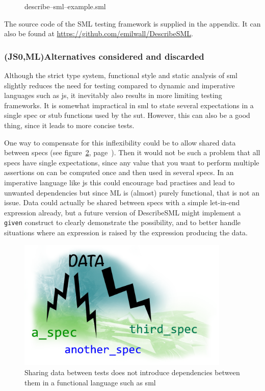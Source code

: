 \documentclass[11pt]{article}
\begin{document}
\begin{figure}[ht!]

\caption{describe–sml–example.sml}
\label{lst:describesmlexample}
\end{figure}

The source code of the SML testing framework is supplied in the appendix. It can also be found at \url{https://github.com/emilwall/DescribeSML}.

\subsubsection{(JS0,ML)Alternatives considered and discarded}

Although the strict type system, functional style and static analysis of \gls{sml} slightly reduces the need for testing compared to dynamic and imperative languages such as \gls{js}, it inevitably also results in more limiting testing frameworks. It is somewhat impractical in \gls{sml} to state several expectations in a single \gls{spec} or stub functions used by the \gls{sut}. However, this can also be a good thing, since it leads to more concise tests.

One way to compensate for this inflexibility could be to allow shared data between \glspl{spec} (see figure~\ref{fig:data}, page~\pageref{fig:data}). Then it would not be such a problem that all \glspl{spec} have single expectations, since any value that you want to perform multiple assertions on can be computed once and then used in several \glspl{spec}. In an imperative language like \gls{js} this could encourage bad practises and lead to unwanted dependencies but since ML is (almost) purely functional, that is not an issue. Data could actually be shared between \glspl{spec} with a simple let-in-end expression already, but a future version of DescribeSML might implement a \texttt{given} construct to clearly demonstrate the possibility, and to better handle situations where an expression is raised by the expression producing the data.

\begin{figure}[ht!]
\centering
\includegraphics[width=0.9\textwidth]{pics/data.png}
\caption{Sharing data between tests does not introduce dependencies between them in a functional language such as \gls{sml}}
\label{fig:data}
\end{figure}
\end{document}
